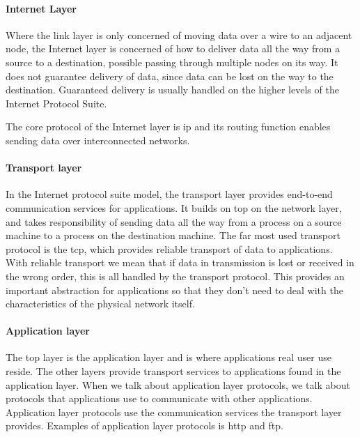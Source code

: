 \paragraph{Internet Layer}

 Where the link layer is only concerned of moving data over a wire to an
 adjacent node, the Internet layer is concerned of how to deliver data all the
 way from a source to a destination, possible passing through multiple nodes on
 its way. It does not guarantee delivery of data, since data can be lost on the
 way to the destination. Guaranteed delivery is usually handled on the higher
 levels of the Internet Protocol Suite.

 The core protocol of the Internet layer is \gls{ip} and its routing function
 enables sending data over interconnected networks.

\paragraph{Transport layer}

In the Internet protocol suite model, the transport layer provides end-to-end
communication services for applications. It builds on top on the network layer,
and takes responsibility of sending data all the way from a process on a source
machine to a process on the destination machine. The far most used transport
protocol is the \gls{tcp}, which provides reliable transport of data to
applications. With reliable transport we mean that if data in transmission is
lost or received in the wrong order, this is all handled by the transport
protocol. This provides an important abstraction for applications so that they
don't need to deal with the characteristics of the physical network itself.

\paragraph{Application layer}

The top layer is the application layer and is where applications real user use
reside. The other layers provide transport services to applications found in the
application layer. When we talk about application layer protocols, we talk about
protocols that applications use to communicate with other applications.
Application layer protocols use the communication services the transport layer
provides.  Examples of application layer protocols is \gls{http} and \gls{ftp}.

